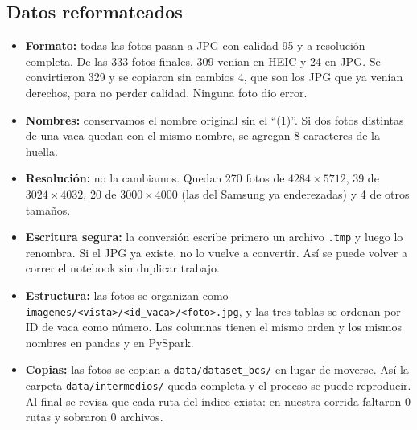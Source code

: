 \subsection{Datos reformateados}\label{sec:reformateados}

\begin{itemize}
  \item \textbf{Formato:} todas las fotos pasan a JPG con calidad 95 y a resolución completa. De las 333 fotos finales, 309 venían en HEIC y 24 en JPG. Se convirtieron 329 y se copiaron sin cambios 4, que son los JPG que ya venían derechos, para no perder calidad. Ninguna foto dio error.
  \item \textbf{Nombres:} conservamos el nombre original sin el ``(1)''. Si dos fotos distintas de una vaca quedan con el mismo nombre, se agregan 8 caracteres de la huella.
  \item \textbf{Resolución:} no la cambiamos. Quedan 270 fotos de $4284 \times 5712$, 39 de $3024 \times 4032$, 20 de $3000 \times 4000$ (las del Samsung ya enderezadas) y 4 de otros tamaños.
  \item \textbf{Escritura segura:} la conversión escribe primero un archivo \nolinkurl{.tmp} y luego lo renombra. Si el JPG ya existe, no lo vuelve a convertir. Así se puede volver a correr el notebook sin duplicar trabajo.
  \item \textbf{Estructura:} las fotos se organizan como \nolinkurl{imagenes/<vista>/<id_vaca>/<foto>.jpg}, y las tres tablas se ordenan por ID de vaca como número. Las columnas tienen el mismo orden y los mismos nombres en pandas y en PySpark.
  \item \textbf{Copias:} las fotos se copian a \nolinkurl{data/dataset_bcs/} en lugar de moverse. Así la carpeta \nolinkurl{data/intermedios/} queda completa y el proceso se puede reproducir. Al final se revisa que cada ruta del índice exista: en nuestra corrida faltaron 0 rutas y sobraron 0 archivos.
\end{itemize}
